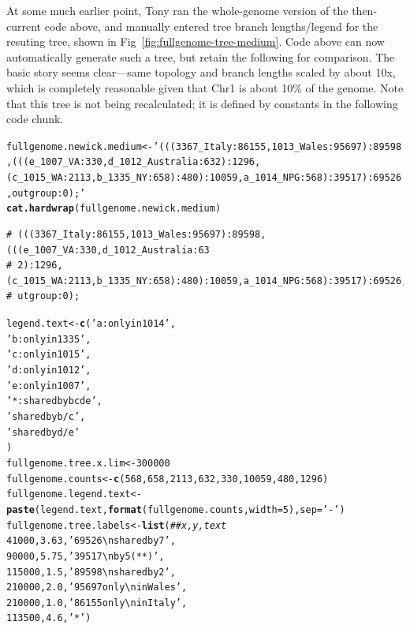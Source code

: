 \documentclass{article}\usepackage[]{graphicx}\usepackage[]{color}
\makeatletter
\newcommand{\hlnum}[1]{\textcolor[rgb]{0.686,0.059,0.569}{#1}}%
\newcommand{\hlstr}[1]{\textcolor[rgb]{0.192,0.494,0.8}{#1}}%
\newcommand{\hlcom}[1]{\textcolor[rgb]{0.678,0.584,0.686}{\textit{#1}}}%
\newcommand{\hlstd}[1]{\textcolor[rgb]{0.345,0.345,0.345}{#1}}%
\newcommand{\hlkwb}[1]{\textcolor[rgb]{0.69,0.353,0.396}{#1}}%
\newcommand{\hlkwc}[1]{\textcolor[rgb]{0.333,0.667,0.333}{#1}}%
\newcommand{\hlkwd}[1]{\textcolor[rgb]{0.737,0.353,0.396}{\textbf{#1}}}%
\newenvironment{kframe}{%
 \def\at@end@of@kframe{}%
 \ifinner\ifhmode%
  \def\at@end@of@kframe{\end{minipage}}%
  \begin{minipage}{\columnwidth}%
 \fi\fi%
 \def\FrameCommand##1{\hskip\@totalleftmargin \hskip-\fboxsep
 \colorbox{shadecolor}{##1}\hskip-\fboxsep
     \hskip-\linewidth \hskip-\@totalleftmargin \hskip\columnwidth}%
 \MakeFramed {\advance\hsize-\width
   \@totalleftmargin\z@ \linewidth\hsize
   \@setminipage}}%
 {\par\unskip\endMakeFramed%
 \at@end@of@kframe}
\newenvironment{knitrout}{}{} %
\makeatother
\begin{document}
At some much earlier point, Tony ran the whole-genome version of the then-current code above, and manually entered tree branch lengths/legend for the resuting tree, shown in Fig~\ref{fig:fullgenome-tree-medium}.  Code above can now automatically generate such a tree, but retain the following for comparison.  The basic story seems clear---same topology and branch lengths scaled by about 10x, which is completely reasonable given that Chr1 is about 10\% of the genome.  Note that this tree is not being recalculated; it is defined by constants in the following code chunk.

\begin{knitrout}\scriptsize
{}\color{fgcolor}\begin{kframe}
\begin{alltt}
\hlstd{fullgenome.newick.medium} \hlkwb{<-} \hlstr{'(((3367_Italy:86155,1013_Wales:95697):89598,(((e_1007_VA:330,d_1012_Australia:632):1296,(c_1015_WA:2113,b_1335_NY:658):480):10059,a_1014_NPG:568):39517):69526,outgroup:0);'}
\hlkwd{cat.hardwrap}\hlstd{(fullgenome.newick.medium)}
\end{alltt}
\begin{verbatim}
# (((3367_Italy:86155,1013_Wales:95697):89598,(((e_1007_VA:330,d_1012_Australia:63 
# 2):1296,(c_1015_WA:2113,b_1335_NY:658):480):10059,a_1014_NPG:568):39517):69526,o 
# utgroup:0);
\end{verbatim}
\begin{alltt}
\hlstd{legend.text} \hlkwb{<-} \hlkwd{c}\hlstd{(}\hlstr{'a: only in 1014  '}\hlstd{,}
                 \hlstr{'b: only in 1335  '}\hlstd{,}
                 \hlstr{'c: only in 1015  '}\hlstd{,}
                 \hlstr{'d: only in 1012  '}\hlstd{,}
                 \hlstr{'e: only in 1007  '}\hlstd{,}
                 \hlstr{'*: shared by bcde'}\hlstd{,}
                 \hlstr{'   shared by b/c '}\hlstd{,}
                 \hlstr{'   shared by d/e '}
\hlstd{)}
\hlstd{fullgenome.tree.x.lim} \hlkwb{<-} \hlnum{300000}
\hlstd{fullgenome.counts} \hlkwb{<-} \hlkwd{c}\hlstd{(} \hlnum{568}\hlstd{,} \hlnum{658}\hlstd{,} \hlnum{2113}\hlstd{,} \hlnum{632}\hlstd{,} \hlnum{330}\hlstd{,} \hlnum{10059}\hlstd{,} \hlnum{480}\hlstd{,} \hlnum{1296} \hlstd{)}
\hlstd{fullgenome.legend.text} \hlkwb{<-} \hlkwd{paste}\hlstd{(legend.text,}\hlkwd{format}\hlstd{(fullgenome.counts,}\hlkwc{width}\hlstd{=}\hlnum{5}\hlstd{),}\hlkwc{sep}\hlstd{=}\hlstr{' - '}\hlstd{)}
\hlstd{fullgenome.tree.labels} \hlkwb{<-} \hlkwd{list}\hlstd{(} \hlcom{## x,y,text}
     \hlnum{41000}\hlstd{,}\hlnum{3.63}\hlstd{,}\hlstr{'69526\textbackslash{}nshared by 7'}\hlstd{,}
     \hlnum{90000}\hlstd{,}\hlnum{5.75}\hlstd{,}\hlstr{'39517\textbackslash{}nby 5 (**)'}\hlstd{,}
    \hlnum{115000}\hlstd{,}\hlnum{1.5}\hlstd{,} \hlstr{'89598\textbackslash{}nshared by 2'}\hlstd{,}
    \hlnum{210000}\hlstd{,}\hlnum{2.0}\hlstd{,} \hlstr{'95697 only\textbackslash{}nin Wales'}\hlstd{,}
    \hlnum{210000}\hlstd{,}\hlnum{1.0}\hlstd{,} \hlstr{'86155 only\textbackslash{}nin Italy'}\hlstd{,}
    \hlnum{113500}\hlstd{,}\hlnum{4.6}\hlstd{,} \hlstr{'*'}\hlstd{)}
\end{alltt}
\end{kframe}
\end{knitrout}
\end{document}
